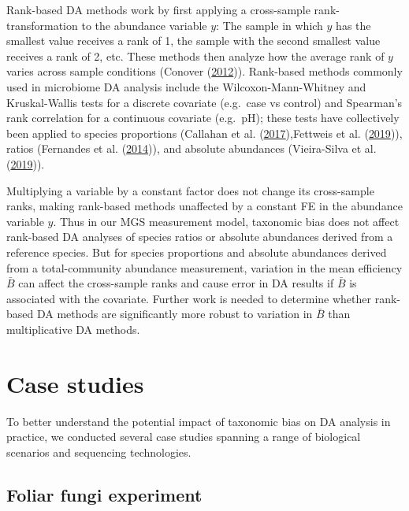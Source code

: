 \documentclass[
]{article}
\begin{document}
Rank-based DA methods work by first applying a cross-sample rank-transformation to the abundance variable \(y\): The sample in which \(y\) has the smallest value receives a rank of 1, the sample with the second smallest value receives a rank of 2, etc.
These methods then analyze how the average rank of \(y\) varies across sample conditions (Conover (\protect\hyperlink{ref-conover2012ther}{2012})).
Rank-based methods commonly used in microbiome DA analysis include the Wilcoxon-Mann-Whitney and Kruskal-Wallis tests for a discrete covariate (e.g.~case vs control) and Spearman's rank correlation for a continuous covariate (e.g.~pH); these tests have collectively been applied to species proportions (Callahan et al. (\protect\hyperlink{ref-callahan2017repl}{2017}),Fettweis et al. (\protect\hyperlink{ref-fettweis2019thev}{2019})), ratios (Fernandes et al. (\protect\hyperlink{ref-fernandes2014unif}{2014})), and absolute abundances (Vieira-Silva et al. (\protect\hyperlink{ref-vieirasilva2019quan}{2019})).

Multiplying a variable by a constant factor does not change its cross-sample ranks, making rank-based methods unaffected by a constant FE in the abundance variable \(y\).
Thus in our MGS measurement model, taxonomic bias does not affect rank-based DA analyses of species ratios or absolute abundances derived from a reference species.
But for species proportions and absolute abundances derived from a total-community abundance measurement, variation in the mean efficiency \(\bar B\) can affect the cross-sample ranks and cause error in DA results if \(\bar B\) is associated with the covariate.
Further work is needed to determine whether rank-based DA methods are significantly more robust to variation in \(\bar B\) than multiplicative DA methods.

\hypertarget{case-studies}{%
\section{Case studies ~}\label{case-studies}}

To better understand the potential impact of taxonomic bias on DA analysis in practice, we conducted several case studies spanning a range of biological scenarios and sequencing technologies.

\hypertarget{foliar-fungi-experiment}{%
\subsection{Foliar fungi experiment}\label{foliar-fungi-experiment}}
\end{document}
